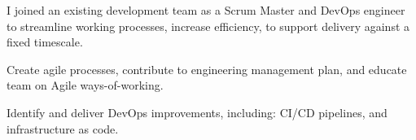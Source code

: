 \sectionsep{}
I joined an existing development team as a Scrum Master and DevOps engineer to streamline working processes, increase efficiency, to support delivery against a fixed timescale.
\vspace{0.25em}
\begin{tightemize}
  \item Create agile processes, contribute to engineering management plan, and educate team on Agile ways-of-working.
  \item Identify and deliver DevOps improvements, including: CI/CD pipelines, and infrastructure as code.
\end{tightemize}
\sectionsep{}
